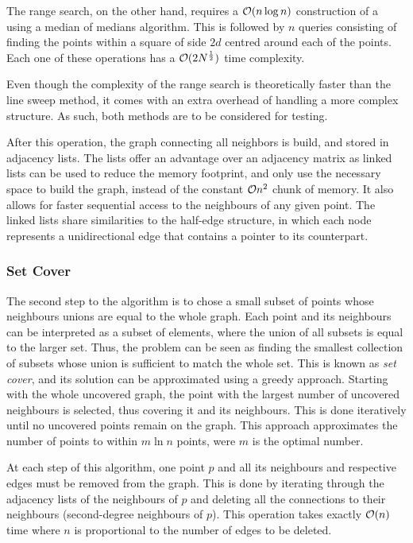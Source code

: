 The \kdtree range search, on the other hand, requires a $\mathcal{O}(n \log{n})$ construction of a \kdtree using a median of medians algorithm. This is followed by $n$ queries consisting of finding the points within a square of side $2d$ centred around each of the points. Each one of these operations has a $\mathcal{O}(2N^{\frac{1}{2}})$ time complexity.

Even though the complexity of the \kdtree range search is theoretically faster than the line sweep method, it comes with an extra overhead of handling a more complex structure. As such, both methods are to be considered for testing.



After this operation, the graph connecting all neighbors is build, and stored in adjacency lists. The lists offer an advantage over an adjacency matrix as linked lists can be used to reduce the memory footprint, and only use the necessary space to build the graph, instead of the constant $\mathcal{O}{n^2}$ chunk of memory. It also allows for faster sequential access to the neighbours of any given point. The linked lists share similarities to the half-edge structure, in which each node represents a unidirectional edge that contains a pointer to its counterpart.

\subsubsection*{Set Cover}
The second step to the algorithm is to chose a small subset of points whose neighbours unions are equal to the whole graph. Each point and its neighbours can be interpreted as a subset of elements, where the union of all subsets is equal to the larger set. Thus, the problem can be seen as finding the smallest collection of subsets whose union is sufficient to match the whole set. This is known as \emph{set cover}, and its solution can be approximated using a greedy approach. Starting with the whole uncovered graph, the point with the largest number of uncovered neighbours is selected, thus covering it and its neighbours. This is done iteratively until no uncovered points remain on the graph. This approach approximates the number of points to within $m \ln{n}$ points, were $m$ is the optimal number.

At each step of this algorithm, one point $p$ and all its neighbours and respective edges must be removed from the graph. This is done by iterating through the adjacency lists of the neighbours of $p$ and deleting all the connections to their neighbours (second-degree neighbours of $p$). This operation takes exactly $\mathcal{O}(n)$ time where $n$ is proportional to the number of edges to be deleted.

